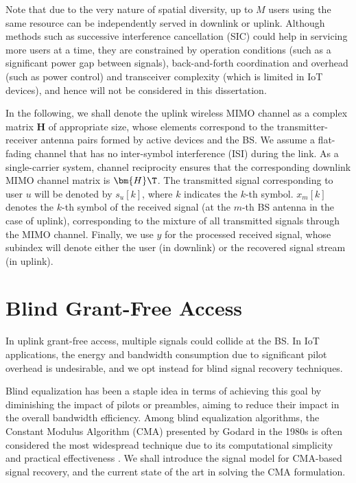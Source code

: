 Note that due to the very nature of spatial diversity, up to $M$ users using the same resource can be independently served in downlink or uplink. Although methods such as successive interference cancellation (SIC) could help in servicing more users at a time, they are constrained by operation conditions (such as a significant power gap between signals), back-and-forth coordination and overhead (such as power control) and transceiver complexity (which is limited in IoT devices), and hence will not be considered in this dissertation.

In the following, we shall denote the uplink wireless MIMO channel as a complex matrix $\bm{H}$ of appropriate size, whose elements correspond to the transmitter-receiver antenna pairs formed by active devices and the BS. We assume a flat-fading channel that has no inter-symbol interference (ISI) during the link. 
As a single-carrier system, channel reciprocity ensures that the corresponding downlink MIMO channel matrix is $\bm{H}\T$.
The transmitted signal corresponding to user $u$ will be denoted by $s_u[k]$, where $k$ indicates the $k$-th symbol. $x_m[k]$ denotes the $k$-th symbol of the received signal (at the $m$-th BS antenna in the case of uplink), corresponding to the mixture of all transmitted signals through the MIMO channel. Finally, we use $y$ for the processed received signal, whose subindex will denote either the user (in downlink) or the recovered signal stream (in uplink).


\section{Blind Grant-Free Access}\label{system:sec:grant_free}
In uplink grant-free access, multiple signals could collide at the BS. In IoT applications, the energy and bandwidth consumption due to significant pilot overhead is undesirable, and we opt instead for blind signal recovery techniques.

Blind equalization has been a staple idea in terms of achieving this goal by diminishing the impact of pilots or preambles, aiming to reduce their impact in the overall bandwidth efficiency. 
Among blind equalization algorithms, the Constant Modulus Algorithm (CMA) presented by Godard \cite{Godard1980cma} in the 1980s is often considered the most widespread technique due to its computational simplicity and practical effectiveness \cite{Treichler1985,Ding2000}. We shall introduce the signal model for CMA-based signal recovery, and the current state of the art in solving the CMA formulation.

